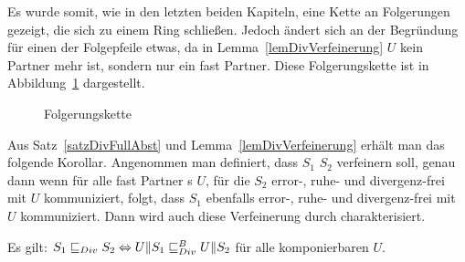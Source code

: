 Es wurde somit, wie in den letzten beiden Kapiteln, eine Kette an Folgerungen
gezeigt, die sich zu einem Ring schließen. Jedoch ändert sich an der Begründung
für einen der Folgepfeile etwas, da in Lemma~\ref{lemDivVerfeinerung} $U$ kein
Partner mehr ist, sondern nur ein fast Partner. Diese Folgerungskette ist in
Abbildung~\ref{FolgerungsketteDiv} dargestellt.

\begin{figure}[h!tbp]
  \begin{center}
    \caption{Folgerungskette}
\label{FolgerungsketteDiv}
  \end{center}
\end{figure}

Aus Satz~\ref{satzDivFullAbst} und Lemma~\ref{lemDivVerfeinerung} erhält man
das folgende Korollar. Angenommen man definiert, dass $S_1$ $S_2$ verfeinern
soll, genau dann wenn für alle fast Partner \EIO{}s $U$, für die $S_2$ error-,
ruhe- und divergenz-frei mit $U$ kommuniziert, folgt, dass $S_1$ ebenfalls
error-, ruhe- und divergenz-frei mit $U$ kommuniziert. Dann wird auch diese
Verfeinerung durch \DRel{} charakterisiert.

\begin{kor}
  Es gilt: $S_1\sqsubseteq _{Div}{} S_2 \Leftrightarrow U\|S_1\sqsubseteq _{Div}^B{} U\|S_2$ für alle
  komponierbaren $U$.
\end{kor}

